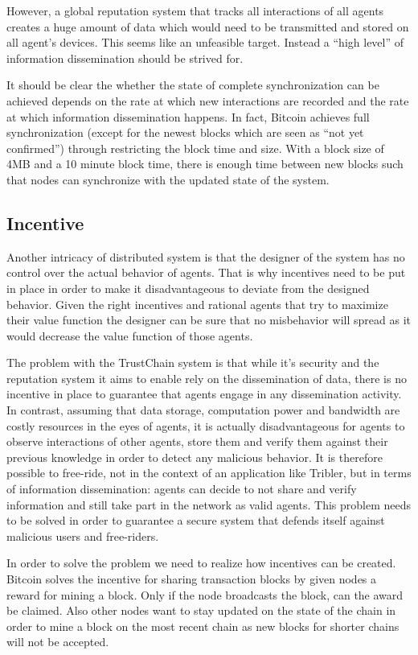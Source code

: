 However, a global reputation system that tracks all interactions of all agents creates a huge amount
of data which would need to be transmitted and stored on all agent's devices. This seems like an
unfeasible target. Instead a ``high level'' of information dissemination should be strived for.

It should be clear the whether the state of complete synchronization can be achieved depends on the
rate at which new interactions are recorded and the rate at which information dissemination happens.
In fact, Bitcoin achieves full synchronization (except for the newest blocks which are seen as ``not
yet confirmed'') through restricting the block time and size. With a block size of 4MB and a 10 minute
block time, there is enough time between new blocks such that nodes can synchronize with the updated
state of the system.

\subsection{Incentive}
Another intricacy of distributed system is that the designer of the system has no control over the 
actual behavior of agents. That is why incentives need to be put in place in order to make it disadvantageous
to deviate from the designed behavior. Given the right incentives and rational agents that try to 
maximize their value function the designer can be sure that no misbehavior will spread as it would 
decrease the value function of those agents.

The problem with the TrustChain system is that while it's security and the reputation system it aims
to enable rely on the dissemination of data, there is no incentive in place to guarantee that agents
engage in any dissemination activity. In contrast, assuming that data storage, computation power and 
bandwidth are costly resources in the eyes of agents, it is actually disadvantageous for agents to 
observe interactions of other agents, store them and verify them against their previous knowledge in
order to detect any malicious behavior. It is therefore possible to free-ride, not in the context 
of an application like Tribler, but in terms of information dissemination: agents can decide to not 
share and verify information and still take part in the network as valid agents. 
This problem needs to be solved in order to guarantee a secure system that defends itself against malicious users
and free-riders. 

In order to solve the problem we need to realize how incentives can be created. Bitcoin solves the 
incentive for sharing transaction blocks by given nodes a reward for mining a block. Only if the 
node broadcasts the block, can the award be claimed. Also other nodes want to stay updated on the 
state of the chain in order to mine a block on the most recent chain as new blocks for shorter chains
will not be accepted. 

